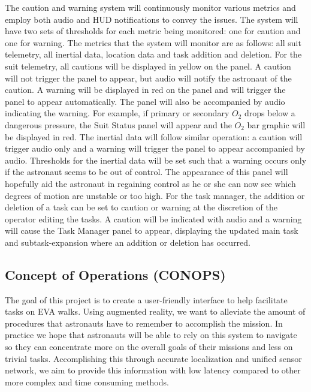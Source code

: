 \documentclass{article}
\let\Oldsubsection\subsection
\renewcommand{\subsection}{\FloatBarrier\Oldsubsection}
\begin{document}
The caution and warning system will continuously monitor various metrics and employ both audio and HUD notifications to convey the issues. The system will have two sets of thresholds for each metric being monitored: one for caution and one for warning. The metrics that the system will monitor are as follows:  all suit telemetry, all inertial data, location data and task addition and deletion. For the suit telemetry, all cautions will be displayed in yellow on the panel. A caution will not trigger the panel to appear, but audio will notify the astronaut of the caution. A warning will be displayed in red on the panel and will trigger the panel to appear automatically. The panel will also be accompanied by audio indicating the warning. For example, if primary or secondary $O_{2}$ drops below a dangerous pressure, the Suit Status panel will appear and the $O_{2}$ bar graphic will be displayed in red. The inertial data will follow similar operation: a caution will trigger audio only and a warning will trigger the panel to appear accompanied by audio. Thresholds for the inertial data will be set such that a warning occurs only if the astronaut seems to be out of control. The appearance of this panel will hopefully aid the astronaut in regaining control as he or she can now see which degrees of motion are unstable or too high. For the task manager, the addition or deletion of a task can be set to caution or warning at the discretion of the operator editing the tasks. A caution will be indicated with audio and a warning will cause the Task Manager panel to appear, displaying the updated main task and subtask-expansion where an addition or deletion has occurred.

\subsection{Concept of Operations (CONOPS)}

The goal of this project is to create a user-friendly interface to help facilitate tasks on EVA walks. Using augmented reality, we want to alleviate the amount of procedures that astronauts have to remember to accomplish the mission. In practice we hope that astronauts will be able to rely on this system to navigate so they can concentrate more on the overall goals of their missions and less on trivial tasks. Accomplishing this through accurate localization and unified sensor network, we aim to provide this information with low latency compared to other more complex and time consuming methods.
\end{document}
